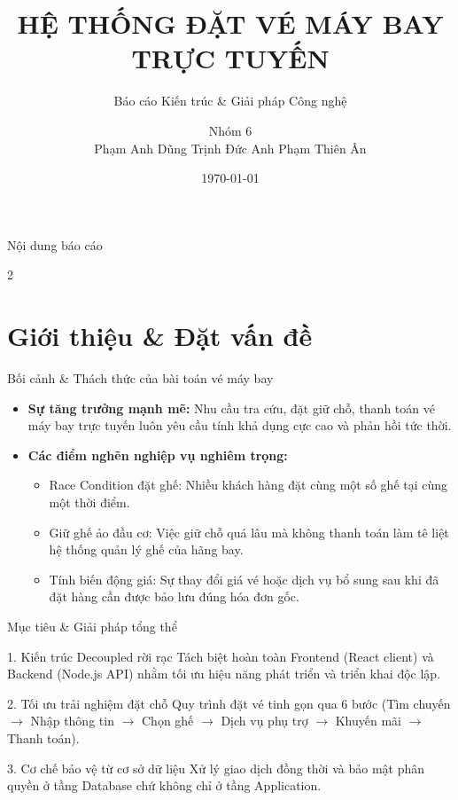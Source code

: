 \documentclass{beamer}
\title[Flight Booking App]{HỆ THỐNG ĐẶT VÉ MÁY BAY TRỰC TUYẾN}
\subtitle{Báo cáo Kiến trúc \& Giải pháp Công nghệ}
\author[Nhóm 6 - Phenikaa]{Nhóm 6 \\ Phạm Anh Dũng \quad Trịnh Đức Anh \quad Phạm Thiên Ân}
\institute[Phenikaa]{Trường Đại học Phenikaa}
\date{\today}
\begin{document}
{
  \begin{frame}
    \titlepage
  \end{frame}
}

\begin{frame}{Nội dung báo cáo}
  \begin{multicols}{2}
    \tableofcontents
  \end{multicols}
\end{frame}

\section{Giới thiệu & Đặt vấn đề}

\begin{frame}{Bối cảnh \& Thách thức của bài toán vé máy bay}
  \begin{itemize}
    \item \textbf{Sự tăng trưởng mạnh mẽ:} Nhu cầu tra cứu, đặt giữ chỗ, thanh toán vé máy bay trực tuyến luôn yêu cầu tính khả dụng cực cao và phản hồi tức thời.
    \item \textbf{Các điểm nghẽn nghiệp vụ nghiêm trọng:}
      \begin{itemize}
        \item \alert{Race Condition đặt ghế:} Nhiều khách hàng đặt cùng một số ghế tại cùng một thời điểm.
        \item \alert{Giữ ghế ảo đầu cơ:} Việc giữ chỗ quá lâu mà không thanh toán làm tê liệt hệ thống quản lý ghế của hãng bay.
        \item \alert{Tính biến động giá:} Sự thay đổi giá vé hoặc dịch vụ bổ sung sau khi đã đặt hàng cần được bảo lưu đúng hóa đơn gốc.
      \end{itemize}
  \end{itemize}
\end{frame}

\begin{frame}{Mục tiêu \& Giải pháp tổng thể}
  \begin{block}{1. Kiến trúc Decoupled rời rạc}
    Tách biệt hoàn toàn Frontend (React client) và Backend (Node.js API) nhằm tối ưu hiệu năng phát triển và triển khai độc lập.
  \end{block}
  \begin{block}{2. Tối ưu trải nghiệm đặt chỗ}
    Quy trình đặt vé tinh gọn qua 6 bước (Tìm chuyến $\rightarrow$ Nhập thông tin $\rightarrow$ Chọn ghế $\rightarrow$ Dịch vụ phụ trợ $\rightarrow$ Khuyến mãi $\rightarrow$ Thanh toán).
  \end{block}
  \begin{block}{3. Cơ chế bảo vệ từ cơ sở dữ liệu}
    Xử lý giao dịch đồng thời và bảo mật phân quyền ở tầng Database chứ không chỉ ở tầng Application.
  \end{block}
\end{frame}
\end{document}

